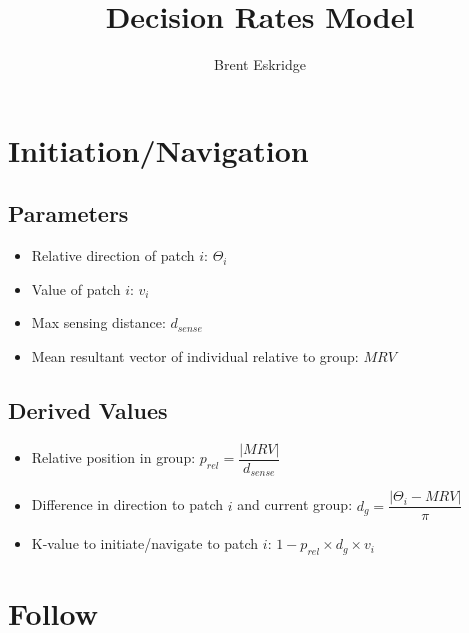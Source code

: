 \documentclass[letterpaper,12pt]{article}
\title{Decision Rates Model}
\author{Brent Eskridge}
\begin{document}
\maketitle


\section{Initiation/Navigation}

\subsection{Parameters}

\begin{itemize}
  \item Relative direction of patch $i$: $\Theta_{i}$
  \item Value of patch $i$: $v_{i}$
  \item Max sensing distance: $d_{sense}$
  \item Mean resultant vector of individual relative to group: $\mathit{MRV}$
\end{itemize}

\subsection{Derived Values}

\begin{itemize}
  \item Relative position in group: $p_{rel} = \dfrac{\vert \mathit{MRV} \rvert}{d_{sense}}$
  \item Difference in direction to patch $i$ and current group: $d_{g} = \dfrac{\lvert \Theta_{i} - \mathit{MRV} \rvert}{\pi}$
  \item K-value to initiate/navigate to patch $i$: $1 - p_{rel} \times d_{g} \times v_{i}$
\end{itemize}


\section{Follow}

\end{document}

